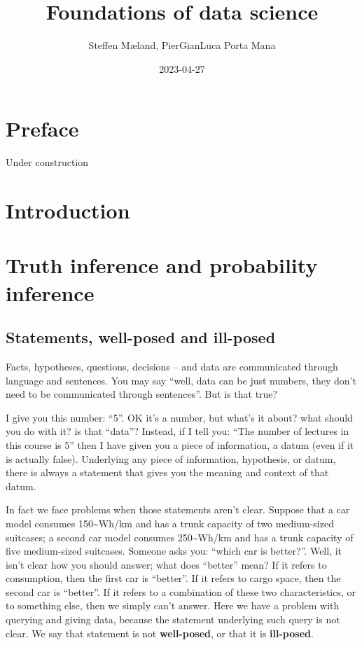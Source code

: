\documentclass[]{book}
\title{Foundations of data science}
\author{Steffen Mæland, PierGianLuca Porta Mana}
\date{2023-04-27}
\begin{document}
\maketitle

{
\setcounter{tocdepth}{1}
\tableofcontents
}
\hypertarget{preface}{%
\chapter*{Preface}\label{preface}}

Under construction

\hypertarget{intro}{%
\chapter{Introduction}\label{intro}}

\hypertarget{truth-inference-and-probability-inference}{%
\chapter{Truth inference and probability inference}\label{truth-inference-and-probability-inference}}

\hypertarget{statements-well-posed-and-ill-posed}{%
\section{Statements, well-posed and ill-posed}\label{statements-well-posed-and-ill-posed}}

Facts, hypotheses, questions, decisions -- and data are communicated through language and sentences. You may say ``well, data can be just numbers, they don't need to be communicated through sentences''. But is that true?

I give you this number: ``5''. OK it's a number, but what's it about? what should you do with it? is that ``data''? Instead, if I tell you: ``The number of lectures in this course is 5'' then I have given you a piece of information, a datum (even if it is actually false). Underlying any piece of information, hypothesis, or datum, there is always a statement that gives you the meaning and context of that datum.

In fact we face problems when those statements aren't clear. Suppose that a car model
consumes 150\textasciitilde{}Wh/km and has a trunk capacity of two medium-sized suitcases; a second car model consumes 250\textasciitilde{}Wh/km and has a trunk capacity of five medium-sized suitcases. Someone asks you: ``which car is better?''. Well, it isn't clear how you should answer; what does ``better'' mean? If it refers to consumption, then the first car is ``better''. If it refers to cargo space, then the second car is ``better''. If it refers to a combination of these two characteristics, or to something else, then we simply can't answer. Here we have a problem with querying and giving data, because the statement underlying such query is not clear. We say that statement is not \textbf{well-posed}, or that it is \textbf{ill-posed}.
\end{document}
